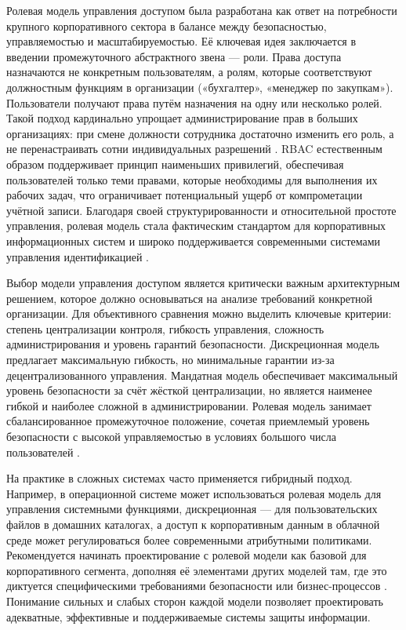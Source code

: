 \documentclass{SibFU-docs}
\begin{document}
Ролевая модель управления доступом была разработана как ответ на потребности крупного корпоративного сектора в балансе между безопасностью, управляемостью и масштабируемостью. Её ключевая идея заключается в введении промежуточного абстрактного звена — роли. Права доступа назначаются не конкретным пользователям, а ролям, которые соответствуют должностным функциям в организации («бухгалтер», «менеджер по закупкам»). Пользователи получают права путём назначения на одну или несколько ролей. Такой подход кардинально упрощает администрирование прав в больших организациях: при смене должности сотрудника достаточно изменить его роль, а не перенастраивать сотни индивидуальных разрешений \cite{cleverence_comparison_2025}. RBAC естественным образом поддерживает принцип наименьших привилегий, обеспечивая пользователей только теми правами, которые необходимы для выполнения их рабочих задач, что ограничивает потенциальный ущерб от компрометации учётной записи. Благодаря своей структурированности и относительной простоте управления, ролевая модель стала фактическим стандартом для корпоративных информационных систем и широко поддерживается современными системами управления идентификацией \cite{rt_solar_models_2023}.


Выбор модели управления доступом является критически важным архитектурным решением, которое должно основываться на анализе требований конкретной организации. Для объективного сравнения можно выделить ключевые критерии: степень централизации контроля, гибкость управления, сложность администрирования и уровень гарантий безопасности. Дискреционная модель предлагает максимальную гибкость, но минимальные гарантии из-за децентрализованного управления. Мандатная модель обеспечивает максимальный уровень безопасности за счёт жёсткой централизации, но является наименее гибкой и наиболее сложной в администрировании. Ролевая модель занимает сбалансированное промежуточное положение, сочетая приемлемый уровень безопасности с высокой управляемостью в условиях большого числа пользователей \cite{cleverence_comparison_2025}.

На практике в сложных системах часто применяется гибридный подход. Например, в операционной системе может использоваться ролевая модель для управления системными функциями, дискреционная — для пользовательских файлов в домашних каталогах, а доступ к корпоративным данным в облачной среде может регулироваться более современными атрибутными политиками. Рекомендуется начинать проектирование с ролевой модели как базовой для корпоративного сегмента, дополняя её элементами других моделей там, где это диктуется специфическими требованиями безопасности или бизнес-процессов \cite{falcongaze_audit_2026}. Понимание сильных и слабых сторон каждой модели позволяет проектировать адекватные, эффективные и поддерживаемые системы защиты информации.
\end{document}
